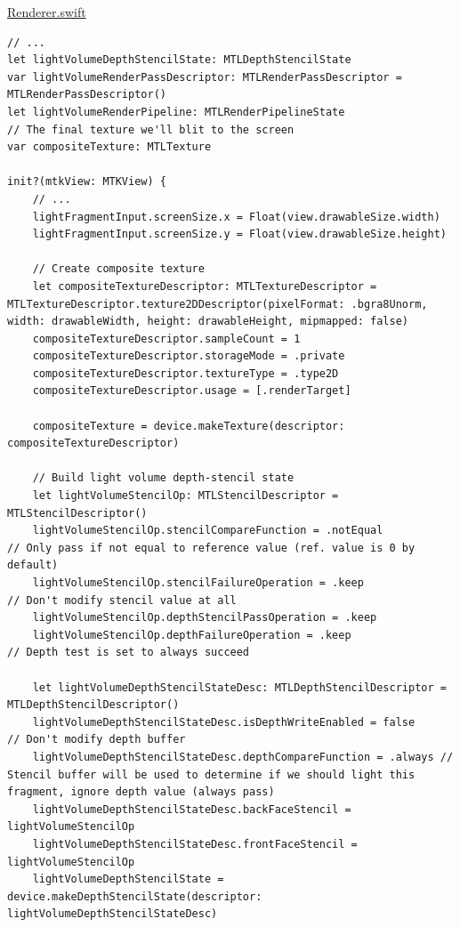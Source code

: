 \documentclass[11pt]{article}
\begin{document}
\uline{Renderer.swift}
\begin{verbatim}
// ...
let lightVolumeDepthStencilState: MTLDepthStencilState
var lightVolumeRenderPassDescriptor: MTLRenderPassDescriptor = MTLRenderPassDescriptor()
let lightVolumeRenderPipeline: MTLRenderPipelineState
// The final texture we'll blit to the screen
var compositeTexture: MTLTexture

init?(mtkView: MTKView) {
    // ...
    lightFragmentInput.screenSize.x = Float(view.drawableSize.width)
    lightFragmentInput.screenSize.y = Float(view.drawableSize.height)

    // Create composite texture
    let compositeTextureDescriptor: MTLTextureDescriptor = MTLTextureDescriptor.texture2DDescriptor(pixelFormat: .bgra8Unorm, width: drawableWidth, height: drawableHeight, mipmapped: false)
    compositeTextureDescriptor.sampleCount = 1
    compositeTextureDescriptor.storageMode = .private
    compositeTextureDescriptor.textureType = .type2D
    compositeTextureDescriptor.usage = [.renderTarget]

    compositeTexture = device.makeTexture(descriptor: compositeTextureDescriptor)

    // Build light volume depth-stencil state
    let lightVolumeStencilOp: MTLStencilDescriptor = MTLStencilDescriptor()
    lightVolumeStencilOp.stencilCompareFunction = .notEqual           // Only pass if not equal to reference value (ref. value is 0 by default)
    lightVolumeStencilOp.stencilFailureOperation = .keep              // Don't modify stencil value at all
    lightVolumeStencilOp.depthStencilPassOperation = .keep
    lightVolumeStencilOp.depthFailureOperation = .keep                // Depth test is set to always succeed

    let lightVolumeDepthStencilStateDesc: MTLDepthStencilDescriptor = MTLDepthStencilDescriptor()
    lightVolumeDepthStencilStateDesc.isDepthWriteEnabled = false       // Don't modify depth buffer
    lightVolumeDepthStencilStateDesc.depthCompareFunction = .always // Stencil buffer will be used to determine if we should light this fragment, ignore depth value (always pass)
    lightVolumeDepthStencilStateDesc.backFaceStencil = lightVolumeStencilOp
    lightVolumeDepthStencilStateDesc.frontFaceStencil = lightVolumeStencilOp
    lightVolumeDepthStencilState = device.makeDepthStencilState(descriptor: lightVolumeDepthStencilStateDesc)


\end{verbatim}
\end{document}
